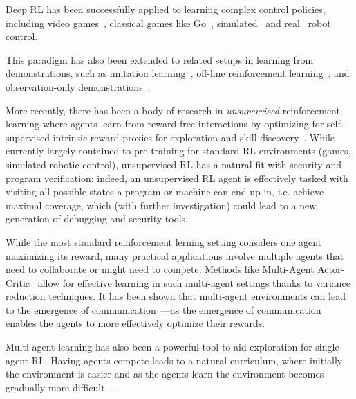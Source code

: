 \documentclass{NSF}
\begin{document}
Deep RL has been successfully applied to learning complex control policies, including video games~\cite{mnih2015human,openai2018dota,arulkumaran2017deep}, classical games like Go~\cite{silver2017alphago}, simulated~\cite{schulman2015trust,lillicrap2015continuous} and real~\cite{levine2016end,kalashnikov2018qt,openai2019solving,nagabandi2019deep} robot control.

This paradigm has also been extended to related setups in learning from demonstrations, such as imitation learning~\cite{ho2016generative,finn2016connection,kuefler2017imitating,fu2017learning}, off-line reinforcement learning~\cite{fujimoto2019off,kumar2019stabilizing,kumar2020conservative,kidambi2020morel,levine2020offline,yu2020mopo}, and observation-only demonstrations~\cite{liu2017imitation,torabi2018generative}.

More recently, there has been a body of research in \textit{unsupervised} reinforcement learning where agents learn from reward-free interactions by optimizing for self-supervised intrinsic reward proxies for exploration and skill discovery~\cite{pathakICMl17curiosity,pathak2019self,eysenbach2018diversity,hansen2019fast, sharma2019dynamics,liu2021aps,liu2021behavior,yarats2021reinforcement}.
While currently largely contained to pre-training for standard RL environments (games, simulated robotic control), unsupervised RL has a natural fit with security and program verification: indeed, an unsupervised RL agent is effectively tasked with visiting all possible states a program or machine can end up in, i.e. achieve maximal coverage, which (with further investigation) could lead to a new generation of debugging and security tools.

While the most standard reinforcement lerning setting considers one agent maximizing its reward, many practical applications involve multiple agents that need to collaborate or might need to compete.
Methods like Multi-Agent Actor-Critic~\cite{lowe2017multiagent} allow for effective learning in such multi-agent settings thanks to variance reduction techniques.
It has been shown that multi-agent environments can lead to the emergence of communication~\cite{foerster2016learning, sukhbaatar2016learning, lazaridou2016multi, mordatch2017emergence}---as the emergence of communication enables the agents to more effectively optimize their rewards.

Multi-agent learning has also been a powerful tool to aid exploration for single-agent RL.
Having agents compete leads to a natural curriculum, where initially the environment is easier and as the agents learn the environment becomes gradually more difficult~\cite{sukhbaatar2017intrinsic,florensa2018automatic,racaniere2019automated,openai2021asymmetric,dennis2020emergent}.
\end{document}
